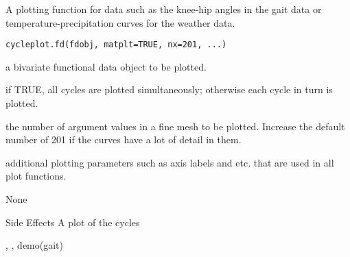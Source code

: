 \begin{Description}\relax
A plotting function for data such as the knee-hip angles in
the gait data or temperature-precipitation curves for the
weather data.
\end{Description}
\begin{Usage}
\begin{verbatim}
cycleplot.fd(fdobj, matplt=TRUE, nx=201, ...)
\end{verbatim}
\end{Usage}
\begin{Arguments}
\begin{ldescription}
\item[\code{fdobj}] a bivariate functional data object to be plotted.

\item[\code{matplt}] if TRUE, all cycles are plotted simultaneously; otherwise
each cycle in turn is plotted.

\item[\code{nx}] the number of argument values in a fine mesh to be
plotted.  Increase the default number of 201 if
the curves have a lot of detail in them.

\item[\code{... }] additional plotting parameters such as axis labels and
etc. that are used in all plot functions.

\end{ldescription}
\end{Arguments}
\begin{Value}
None
\end{Value}
\begin{Section}{Side Effects}
A plot of the cycles
\end{Section}
\begin{SeeAlso}\relax
{}, 
, 
demo(gait)
\end{SeeAlso}

